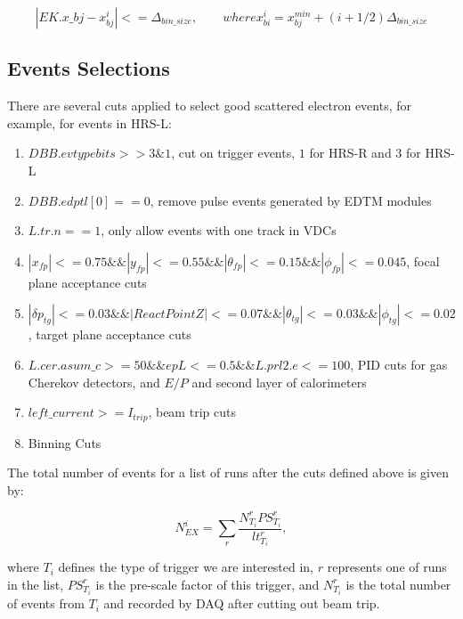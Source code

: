 \begin{equation*}
  |EK.x\_bj - x_{bj}^{i}| <= \Delta_{bin\_size}, \qquad where x_{bi}^{i} = x_{bj}^{min} + (i+1/2)\Delta_{bin\_size}
\end{equation*}
 
\subsection{Events Selections}
  
There are several cuts applied to select good scattered electron events, for example, for events in HRS-L:

\begin{enumerate}
\item \textbf{$DBB.evtypebits>>3\&1$}, cut on trigger events, $1$ for HRS-R and $3$ for HRS-L\\
\item \textbf{$DBB.edptl[0]==0$}, remove pulse events generated by EDTM modules
\item \textbf{$L.tr.n==1$}, only allow events with one track in VDCs \\
\item \textbf{$|x_{fp}|<=0.75 \&\& |y_{fp}|<=0.55 \&\& |\theta_{fp}|<=0.15 \&\& |\phi_{fp}|<=0.045$}, focal plane acceptance cuts \\
\item \textbf{$|\delta p_{tg}|<=0.03 \&\& |ReactPointZ|<=0.07 \&\& |\theta_{tg}|<=0.03 \&\& |\phi_{tg}|<=0.02$}, target plane acceptance cuts \\
\item \textbf{$L.cer.asum\_c>=50 \&\& epL<=0.5 \&\& L.prl2.e<=100$}, PID cuts for gas Cherekov detectors, and $E/P$ and second layer of calorimeters \\
\item \textbf{$left\_current >= I_{trip}$}, beam trip cuts \\
\item Binning Cuts
\end{enumerate}

The total number of events for a list of runs after the cuts defined above is given by:

\begin{equation}
  N_{EX}^{i} = \sum_{r} \frac{N_{T_{i}}^{r} PS_{T_{i}}^{r}}{lt_{T_{i}}^{r}},
\end{equation}

where $T_{i}$ defines the type of trigger we are interested in, $r$ represents one of runs in the list, $PS_{T_{i}}^{r}$ is the pre-scale factor of this trigger, and $N_{T_{i}}^{r}$ is the total number of events from $T_{i}$ and recorded by DAQ after cutting out beam trip. 

